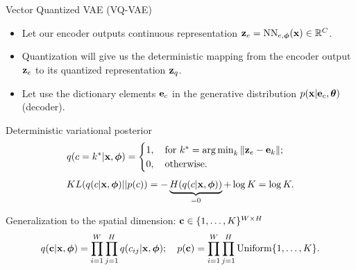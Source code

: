 \begin{frame}{Vector Quantized VAE (VQ-VAE)}
	\begin{itemize}
		\item Let our encoder outputs continuous representation $\mathbf{z}_e = \text{NN}_{e, \boldsymbol{\phi}}(\mathbf{x}) \in \mathbb{R}^{C}$.
		\item Quantization will give us the deterministic mapping from the encoder output $\mathbf{z}_e$ to its quantized representation $\mathbf{z}_q$.
		\item Let use the dictionary elements $\mathbf{e}_c$ in the generative distribution $p(\mathbf{x} | \mathbf{e}_c, \boldsymbol{\theta})$ (decoder).
	\end{itemize}
	\begin{block}{Deterministic variational posterior}
		\vspace{-0.3cm}
		\[
			q(c = k^* | \mathbf{x}, \boldsymbol{\phi}) = \begin{cases}
				1 , \quad \text{for } k^* = \operatorname*{arg\,min}_k \| \mathbf{z}_e - \mathbf{e}_k \|; \\
				0, \quad \text{otherwise}.
		\end{cases}
		\]
		\[
			KL(q(c | \mathbf{x}, \boldsymbol{\phi}) || p(c)) = - \underbrace{H(q(c | \mathbf{x}, \boldsymbol{\phi}))}_{=0} + \log K = \log K. 
		\]
	\end{block}	
	\vspace{-0.4cm}
	Generalization to the spatial dimension: $\mathbf{c} \in \{1, \dots, K\}^{W \times H}$
	\[
		q(\mathbf{c} | \mathbf{x}, \boldsymbol{\phi}) = \prod_{i=1}^W \prod_{j=1}^H q(c_{ij} | \mathbf{x}, \boldsymbol{\phi}); \quad p(\mathbf{c}) = \prod_{i=1}^W \prod_{j=1}^H \text{Uniform}\{1, \dots, K\}.
	\]
\end{frame}
